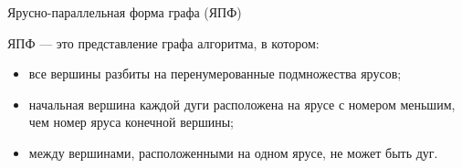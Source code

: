 \begin{frame}{Ярусно-параллельная форма графа (ЯПФ)}

ЯПФ — это представление графа алгоритма, в котором:

    
    \begin{itemize}
        \item все вершины разбиты на перенумерованные подмножества ярусов; 
        \item начальная вершина каждой дуги расположена на ярусе с номером меньшим, чем номер яруса конечной вершины;
        \item между вершинами, расположенными на одном ярусе, не может быть дуг.
    \end{itemize}

    


\end{frame}



